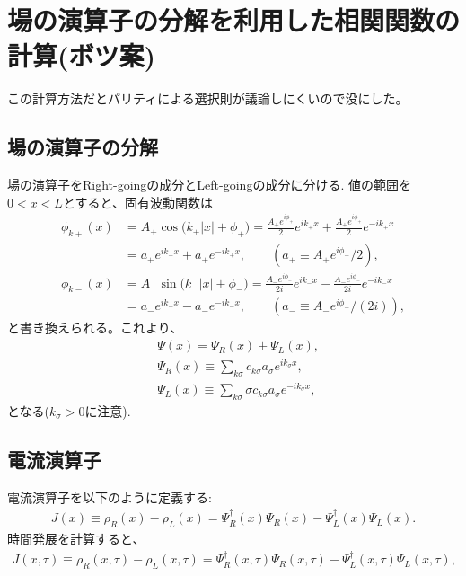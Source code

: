 \documentclass[10pt,a4j]{jarticle}
\begin{document}
\section{場の演算子の分解を利用した相関関数の計算(ボツ案)}

この計算方法だとパリティによる選択則が議論しにくいので没にした。

\subsection{場の演算子の分解}

場の演算子をRight-goingの成分とLeft-goingの成分に分ける. 
値の範囲を$0<x<L$とすると、固有波動関数は
\begin{align}
\phi_{k+}(x) &= A_+ \cos \bigl( k_+ |x| + \phi_+ \bigr)
= \frac{A_+ e^{i\phi_+}}{2} e^{ik_+x} + \frac{A_+ e^{i\phi_+}}{2} e^{-ik_+ x} \nonumber \\
& = a_+ e^{ik_+x} + a_+ e^{-ik_+x}, \quad \quad (a_+ \equiv A_+ e^{i\phi_+}/2), \\
\phi_{k-}(x) &= A_- \sin \bigl( k_- |x| + \phi_- \bigr)
= \frac{A_- e^{i\phi_-}}{2i} e^{ik_-x} - \frac{A_- e^{i\phi_-}}{2i} e^{-ik_-x} \nonumber \\
& = a_- e^{ik_-x} - a_- e^{-ik_-x}, \quad \quad (a_- \equiv A_- e^{i\phi_-}/(2i) ), 
\end{align}
と書き換えられる。これより、
\begin{align}
& \Psi(x) = \Psi_R(x) + \Psi_L(x), \label{eq62} \\
& \Psi_R(x) \equiv \sum_{k\sigma} c_{k\sigma} a_\sigma e^{ik_{\sigma}x}, \\
& \Psi_L(x) \equiv \sum_{k\sigma} \sigma c_{k\sigma} a_\sigma e^{-ik_{\sigma}x}, \label{eq64}
\end{align}
となる($k_\sigma>0$に注意).

\subsection{電流演算子}

電流演算子を以下のように定義する:
\begin{align}
J(x) \equiv \rho_R(x) - \rho_L(x) = \Psi_R^\dagger(x) \Psi_R(x) - \Psi_L^\dagger(x) \Psi_L(x).
\label{eq:Jrhorelation}
\end{align}
時間発展を計算すると、
\begin{align}
J(x,\tau) \equiv \rho_R(x,\tau) - \rho_L(x,\tau) 
= \Psi_R^\dagger(x,\tau) \Psi_R(x,\tau) - \Psi_L^\dagger(x,\tau) \Psi_L(x,\tau) ,
\end{align}
\end{document}
